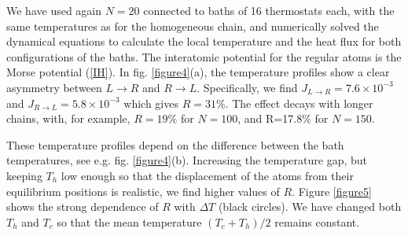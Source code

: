 We have used again $N=20$ connected to baths of 16 thermostats each, with the same temperatures as for the homogeneous chain, and numerically solved the dynamical equations
to calculate the local temperature and the heat flux for both configurations of the baths. The interatomic potential for the regular atoms is the Morse potential (\ref{IH}).
In fig. \ref{figure4}(a), the temperature profiles show a clear asymmetry between ${L\rightarrow R}$ and ${R\rightarrow L}$. Specifically, we find $J_{L\rightarrow R}=7.6 \times 10^{-3}$ and $J_{R\rightarrow L}=5.8 \times 10^{-3}$ which gives
$R=31\%$. The effect decays with longer chains,  with, for example, $R=19\%$ for $N=100$, and R=17.8\% for $N=150$.

These temperature profiles depend on the difference between the bath temperatures, see e.g. fig. \ref{figure4}(b). Increasing the temperature gap, but  keeping $T_h$ low enough so that the displacement of the atoms from their equilibrium positions is realistic, we find higher values of $R$. Figure \ref {figure5} shows the strong dependence of $R$ with $\Delta T$ (black circles).
We have changed both $T_h$ and $T_c$ so that the mean temperature $(T_c+T_h)/2$ remains constant.





